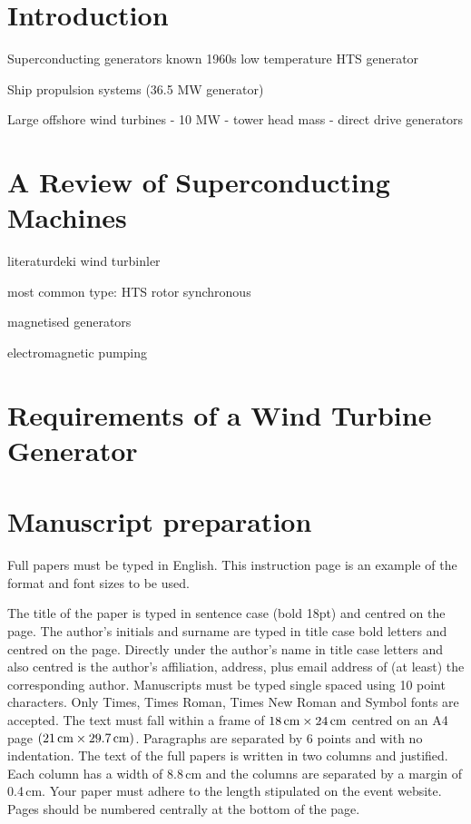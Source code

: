 \documentclass[12pt]{IET02}
\begin{document}
\section{Introduction}

Superconducting generators known 1960s
low temperature HTS generator

Ship propulsion systems (36.5 MW generator)

Large offshore wind turbines
- 10 MW
- tower head mass
- direct drive generators


\section{A Review of Superconducting Machines}

literaturdeki wind turbinler

most common type: HTS rotor synchronous

magnetised generators

electromagnetic pumping 

\section{Requirements of a Wind Turbine Generator}


\section{Manuscript preparation}

Full papers must be typed in English. This instruction page is an
example of the format and font sizes to be used.

The title of the paper is typed in sentence case (bold 18pt) and
centred on the page. The author's initials and surname are typed
in title case bold letters and centred on the page. Directly under
the author's name in title case letters and also centred is the
author's affiliation, address, plus email address of (at least)
the corresponding author. Manuscripts must be typed single spaced
using 10 point characters. Only Times, Times Roman, Times New
Roman and Symbol fonts are accepted. The text must fall within a
frame of $18\,\hbox{cm} \times 24\,\hbox{cm}$ centred on an A4
page $(21\,\hbox{cm} \times 29.7\,\hbox{cm})$. Paragraphs are
separated by 6 points and with no indentation. The text of the
full papers is written in two columns and justified. Each column
has a width of 8.8\,cm and the columns are separated by a margin
of 0.4\,cm. Your paper must adhere to the length stipulated on the
event website. Pages should be numbered centrally at the bottom of
the page.
\end{document}
